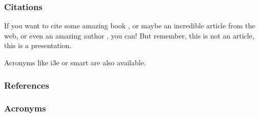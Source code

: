 \documentclass[aspectratio=169,table,xcdraw,18pt,portugues]{beamer}
\begin{document}

\begin{frame}
    \frametitle{Citations}

    If you want to cite some amazing book \cite{Genius1801}, or maybe
    an incredible article \cite{LaTeX2020} from the web, or even an
    amazing author \cite{SomeAuthor2022}, you can! But remember, this is
    not an article, this is a presentation.

    Acronyms like \ac{i3e} or \ac{smart} are also available.

\end{frame}


\begin{frame}[t,allowframebreaks]
    \frametitle{References}
    \printbibliography
\end{frame}


\begin{frame}
    \frametitle{Acronyms}
    \begin{acronym}[ICANN]
    \end{acronym}
\end{frame}


{
}

\end{document}

